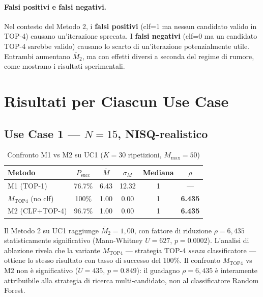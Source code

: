 \begin{onehalfspace}
\paragraph{Falsi positivi e falsi negativi.}
Nel contesto del Metodo 2, i \textbf{falsi positivi} (clf=1 ma nessun candidato valido in TOP-4) causano un'iterazione sprecata. I \textbf{falsi negativi} (clf=0 ma un candidato TOP-4 sarebbe valido) causano lo scarto di un'iterazione potenzialmente utile. Entrambi aumentano $\bar{M}_2$, ma con effetti diversi a seconda del regime di rumore, come mostrano i risultati sperimentali.

\section{Risultati per Ciascun Use Case}
\label{sec:risultati_uc_m2}

\subsection{Use Case 1 — $N = 15$, NISQ-realistico}
\label{sec:uc1_m2}

\begin{table}[H]
\centering
\caption{Confronto M1 vs M2 su UC1 ($K=30$ ripetizioni, $M_{\text{max}}=50$)}
\label{tab:confronto_uc1}
\begin{tabular}{lccccc}
\hline
\textbf{Metodo} & \textbf{$P_{\text{succ}}$} & \textbf{$\bar{M}$} & \textbf{$\sigma_M$} & \textbf{Mediana} & \textbf{$\rho$} \\
\hline
M1 (TOP-1)                  & 76.7\% & 6.43 & 12.32 & 1 & --- \\
$M_{\text{TOP4}}$ (no clf)  & 100\%  & 1.00 & 0.00  & 1 & \textbf{6.435} \\
M2 (CLF+TOP-4)              & 96.7\% & 1.00 & 0.00  & 1 & \textbf{6.435} \\
\hline
\end{tabular}
\end{table}

Il Metodo 2 su UC1 raggiunge $\bar{M}_2 = 1{,}00$, con fattore di riduzione $\rho = 6{,}435$ statisticamente significativo (Mann-Whitney $U = 627$, $p = 0.0002$). L'analisi di ablazione rivela che la variante $M_{\text{TOP4}}$ --- strategia TOP-4 \emph{senza} classificatore --- ottiene lo stesso risultato con tasso di successo del 100\%. Il confronto $M_{\text{TOP4}}$ vs M2 non è significativo ($U = 435$, $p = 0.849$): il guadagno $\rho = 6{,}435$ è interamente attribuibile alla strategia di ricerca multi-candidato, non al classificatore Random Forest.


\end{onehalfspace}
